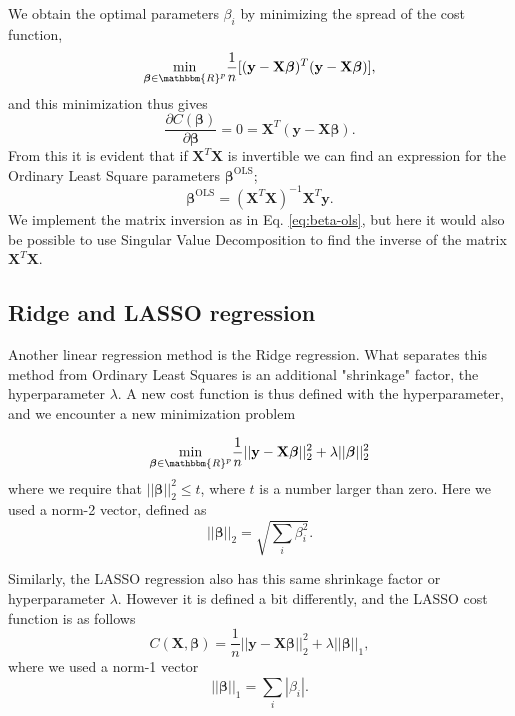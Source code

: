 \documentclass[norsk,a4paper,12pt]{article}
\begin{document}
\begin{multicols}{2}
We obtain the optimal parameters $\beta_i$ by minimizing the spread of the cost function,
\begin{equation*}
    \underset{\boldsymbol{\beta} \in \mathbbm{R}^p}{\mathrm{min}} \frac{1}{n}[(\mathbf{y} - \mathbf{X}\boldsymbol{\beta})^T (\mathbf{y} - \mathbf{X}\boldsymbol{\beta})],
\end{equation*}
and this minimization thus gives
\begin{equation*}
    \frac{\partial C(\boldsymbol{\beta})}{\partial \boldsymbol{\beta}} = 0 = \mathbf{X}^T (\mathbf{y} - \mathbf{X}\boldsymbol{\beta}).
\end{equation*}
From this it is evident that if $\mathbf{X}^T \mathbf{X}$ is invertible we can find an expression for the Ordinary Least Square parameters $\boldsymbol{\beta}^{\mathrm{OLS}}$;
\begin{equation}
    \boldsymbol{\beta}^{\mathrm{OLS}} = (\mathbf{X}^T \mathbf{X})^{-1} \mathbf{X}^T \mathbf{y}.
    \label{eq:beta-ols}
\end{equation}
We implement the matrix inversion as in Eq. \ref{eq:beta-ols}, but here it would also be possible to use Singular Value Decomposition to find the inverse of the matrix $\mathbf{X}^T \mathbf{X}$. 

\subsection{Ridge and LASSO regression}
Another linear regression method is the Ridge regression. What separates this method from Ordinary Least Squares is an additional "shrinkage" factor, the hyperparameter $\lambda$. A new cost function is thus defined with the hyperparameter, and we encounter a new minimization problem

\begin{equation*}
    \underset{\boldsymbol{\beta} \in \mathbbm{R}^p}{\mathrm{min}} \frac{1}{n} || \mathbf{y} - \mathbf{X}\boldsymbol{\beta} ||_2^2 + \lambda || \boldsymbol{\beta} ||_2^2
\end{equation*}
where we require that $|| \boldsymbol{\beta} ||_2^2 \leq t$, where $t$ is a number larger than zero. Here we used a norm-2 vector, defined as
\begin{equation*}
    || \boldsymbol{\beta}||_2 = \sqrt{\sum_i \beta_i^2}.
\end{equation*}

Similarly, the LASSO regression also has this same shrinkage factor or hyperparameter $\lambda$. However it is defined a bit differently, and the LASSO cost function is as follows
\begin{equation}
    C(\mathbf{X}, \boldsymbol{\beta}) =  \frac{1}{n} || \mathbf{y} - \mathbf{X}\boldsymbol{\beta} ||_2^2 + \lambda || \boldsymbol{\beta} ||_1,
    \label{eq:LASSO-cost}
\end{equation}
where we used a norm-1 vector
\begin{equation*}
    || \boldsymbol{\beta}||_1 = \sum_i |\beta_i|.
\end{equation*}


\end{multicols}
\end{document}
